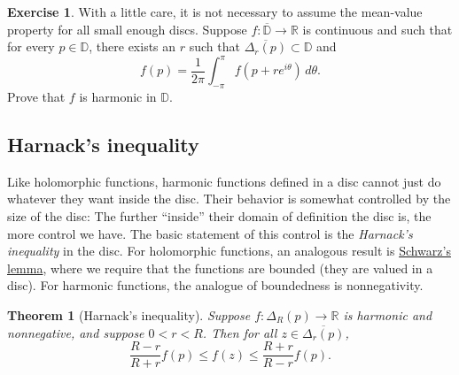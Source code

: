 \documentclass[12pt,openany]{book}
\newcommand{\R}{{\mathbb{R}}}
\newcommand{\D}{{\mathbb{D}}}
\newcommand{\myquote}[1]{``#1''}
\theoremstyle{plain}
\newtheorem{thm}{Theorem}[section]
\theoremstyle{remark}
\theoremstyle{definition}
\newenvironment{exbox}{%
    \def\FrameCommand{\vrule width 1pt \relax\hspace{10pt}}%
    \MakeFramed{\advance\hsize-\width\FrameRestore}%
}{%
    \endMakeFramed
}
\theoremstyle{exercise}
\newtheorem{exercise}{Exercise}[section]
\theoremstyle{example}
\begin{document}
\begin{exbox}
\begin{exercise}
With a little care,
it is not necessary to assume the mean-value property for all small enough discs.
Suppose $f \colon \overline{\D} \to \R$ is
continuous and such that for every $p \in \D$, there exists an $r$ such that
$\overline{\Delta_r(p)} \subset \D$ and 
\begin{equation*}
f(p) = \frac{1}{2\pi} \int_{-\pi}^{\pi} f(p+re^{i\theta})\, d\theta .
\end{equation*}
Prove that $f$ is harmonic in $\D$.
\end{exercise}
\end{exbox}

\subsection{Harnack's inequality}

Like holomorphic functions, harmonic functions defined in a
disc cannot just do whatever they want inside the disc.  Their behavior is
somewhat controlled by the size of the disc:  The further
\myquote{inside} their domain of definition the disc is, the more control we have.
The basic statement of this control is
the \emph{Harnack's inequality} in the disc.
For holomorphic functions, an analogous result is
\hyperref[lemma:schwarz]{Schwarz's lemma}, where we
require that the functions are bounded (they are valued in a disc).  For harmonic
functions, the analogue of boundedness is nonnegativity.

\begin{thm}[Harnack's inequality]
\label{thm:harnackineqdisc}
Suppose $f \colon \Delta_R(p) \to \R$ is harmonic and nonnegative,
and suppose $0 < r < R$.
Then for all $z \in \overline{\Delta_r(p)}$,
\begin{equation*}
\frac{R-r}{R+r} f(p) \leq f(z) \leq \frac{R+r}{R-r} f(p) .
\end{equation*}
\end{thm}
\end{document}
